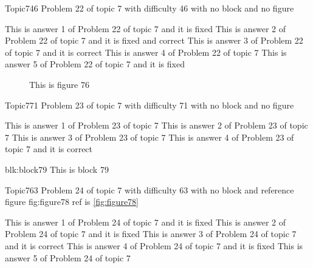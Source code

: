\documentclass[master]{exam}
\begin{document}
\begin{problem}{Topic7}{46}
	Problem 22 of topic 7 with difficulty 46 with no block and no figure
	\begin{answers}
		\answer[fixed] This is answer 1 of Problem 22 of topic 7 and it is fixed
		 This is answer 2 of Problem 22 of topic 7 and it is fixed and correct
		\answer[correct] This is answer 3 of Problem 22 of topic 7 and it is correct
		\answer This is answer 4 of Problem 22 of topic 7 
		\answer[fixed] This is answer 5 of Problem 22 of topic 7 and it is fixed
	\end{answers}
\end{problem}



\begin{figure}
	\begin{center}
		This is figure 76 
		\label{fig:figure76}
	\end{center}
\end{figure}

\begin{problem}{Topic7}{71}
	Problem 23 of topic 7 with difficulty 71 with no block and no figure
	\begin{answers}
		\answer This is answer 1 of Problem 23 of topic 7 
		\answer This is answer 2 of Problem 23 of topic 7 
		\answer This is answer 3 of Problem 23 of topic 7 
		\answer[correct] This is answer 4 of Problem 23 of topic 7 and it is correct
	\end{answers}
\end{problem}



\begin{block}{blk:block79}
This is block 79
\end{block}


\begin{problem}{Topic7}{63}
	Problem 24 of topic 7 with difficulty 63 with no block and reference figure fig:figure78 ref is \ref{fig:figure78}
	\begin{answers}
		\answer[fixed] This is answer 1 of Problem 24 of topic 7 and it is fixed
		\answer[fixed] This is answer 2 of Problem 24 of topic 7 and it is fixed
		\answer[correct] This is answer 3 of Problem 24 of topic 7 and it is correct
		\answer[fixed] This is answer 4 of Problem 24 of topic 7 and it is fixed
		\answer This is answer 5 of Problem 24 of topic 7 
	\end{answers}
\end{problem}
\end{document}
